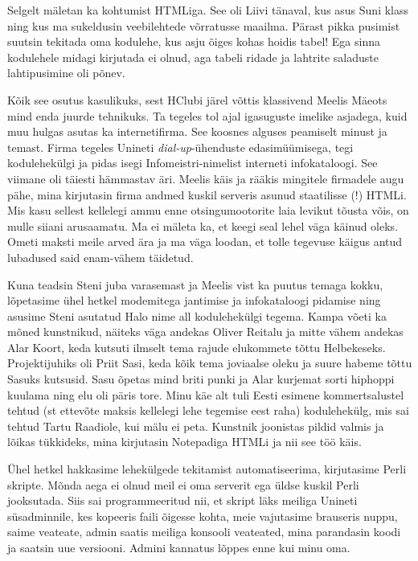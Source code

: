 Selgelt mäletan ka kohtumist HTMLiga. See oli Liivi 
tänaval, kus asus Suni 
klass 
ning kus ma sukeldusin veebilehtede 
võrratusse maailma. Pärast pikka pusimist suutsin tekitada oma kodulehe, kus 
asju õiges kohas hoidis tabel! Ega sinna kodulehele midagi kirjutada ei olnud, 
aga tabeli ridade ja lahtrite saladuste lahtipusimine oli põnev.

Kõik see osutus kasulikuks, sest HClubi järel võttis 
klassivend Meelis Mäeots mind enda juurde tehnikuks. Ta tegeles tol ajal 
igasuguste imelike asjadega, kuid muu hulgas asutas ka internetifirma. See koosnes 
alguses peamiselt minust ja temast. Firma tegeles Unineti 
\emph{dial-up}-ühenduste edasimüümisega, tegi kodulehekülgi ja pidas isegi 
Infomeistri-nimelist interneti infokataloogi. See viimane oli täiesti hämmastav 
äri. Meelis käis ja rääkis mingitele firmadele augu pähe, mina kirjutasin firma 
andmed kuskil serveris asunud staatilisse (!) HTMLi. Mis kasu sellest kellelegi 
ammu enne otsingumootorite laia levikut tõusta võis, on mulle siiani 
arusaamatu. Ma ei mäleta ka, et keegi seal lehel väga käinud oleks. Ometi maksti 
meile arved ära ja ma väga loodan, et tolle tegevuse käigus antud lubadused said
enam-vähem täidetud. 

Kuna teadsin Steni juba varasemast ja Meelis vist ka puutus temaga kokku, 
lõpetasime ühel hetkel modemitega jantimise ja infokataloogi pidamise ning 
asusime Steni asutatud Halo nime all kodulehekülgi tegema. Kampa 
võeti ka mõned kunstnikud, näiteks väga andekas Oliver 
Reitalu ja mitte vähem andekas Alar 
Koort, keda kutsuti ilmselt tema rajude elukommete tõttu 
Helbekeseks. Projektijuhiks oli Priit Sasi, keda 
kõik tema joviaalse oleku ja suure habeme tõttu Sasuks kutsusid. Sasu õpetas 
mind briti punki ja Alar kurjemat sorti hiphoppi kuulama ning elu oli päris tore. 
Minu käe alt tuli Eesti esimene kommertsalustel tehtud 
(st ettevõte maksis kellelegi lehe tegemise eest raha) kodulehekülg, mis sai 
tehtud Tartu Raadiole, kui mälu ei peta. Kunstnik joonistas 
pildid valmis ja lõikas tükkideks, mina kirjutasin Notepadiga HTMLi ja nii see 
töö käis. 

Ühel hetkel hakkasime lehekülgede tekitamist automatiseerima, kirjutasime 
Perli skripte. Mõnda aega ei olnud meil ei oma serverit ega üldse kuskil Perli 
jooksutada. Siis sai programmeeritud nii, et skript läks meiliga
Unineti süsadminnile, kes kopeeris faili õigesse kohta, meie 
vajutasime brauseris nuppu, saime veateate, admin saatis meiliga konsooli 
veateated, mina parandasin koodi ja saatsin uue versiooni. Admini kannatus 
lõppes enne kui minu oma. 

